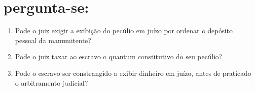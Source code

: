 \section{pergunta-se:}

\begin{enumerate}[label=\arabic*º]
\item Pode o juiz exigir a exibição do pecúlio em juízo por ordenar o
depósito pessoal da manumitente?

\item Pode o juiz taxar ao escravo o quantum constitutivo do seu
pecúlio?

\item Pode o escravo ser constrangido a exibir dinheiro em juízo, antes
de praticado o arbitramento judicial?
\end{enumerate}

